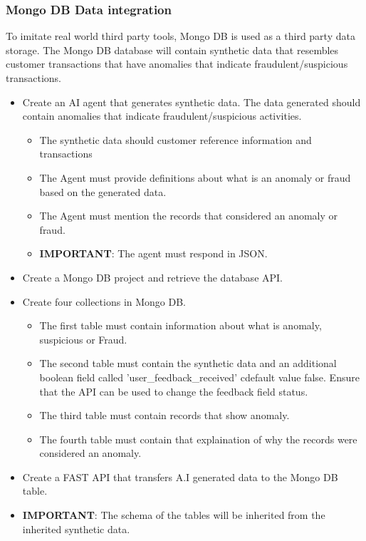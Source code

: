 \documentclass{article}
\begin{document}
\subsubsection{Mongo DB Data integration}
To imitate real world third party tools, Mongo DB is used as a third party data storage. The Mongo DB
database will contain synthetic data that resembles customer transactions that have anomalies that indicate 
fraudulent/suspicious transactions.
\begin{itemize}
    \item Create an AI agent that generates synthetic data. The data generated should contain anomalies that indicate fraudulent/suspicious activities.
    \begin{itemize}
        \item The synthetic data should customer reference information and transactions
        \item The Agent must provide definitions about what is an anomaly or fraud based on the generated data.
        \item The Agent must mention the records that considered an anomaly or fraud.
        \item \textbf{IMPORTANT}: The agent must respond in JSON.
    \end{itemize}
    \item Create a Mongo DB project and retrieve the database API.
    \item Create four collections in Mongo DB.
    \begin{itemize}
        \item The first table must contain information about what is anomaly, suspicious or Fraud.
        \item The second table must contain the synthetic data and an additional boolean field called 'user\_feedback\_received' cdefault value false. 
        Ensure that the API can be used to change the feedback field status.
        \item The third table must contain records that show anomaly.
        \item The fourth table must contain that explaination of why the records were considered an anomaly.
    \end{itemize}
    \item Create a FAST API that transfers A.I generated data to the Mongo DB table.
    \item \textbf{IMPORTANT}: The schema of the tables will be inherited from the inherited synthetic data.
\end{itemize}
\end{document}
